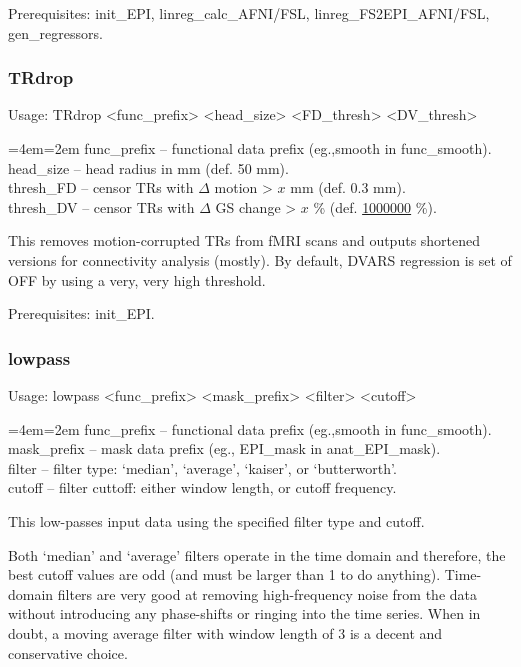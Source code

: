 \documentclass[final,titlepage,letterpaper,oneside,12pt]{article}
\renewcommand{\texttt}[2][BrickRed]{\textcolor{#1}{\ttfamily #2}}%
\newenvironment{blockquote}{%
  \par%
  \medskip
  \leftskip=4em\rightskip=2em%
  \noindent\ignorespaces}{%
  \par\medskip}
\begin{document}
Prerequisites: \texttt{init\_EPI}, \texttt{linreg\_calc\_AFNI/FSL}, \texttt{linreg\_FS2EPI\_AFNI/FSL}, \texttt{gen\_regressors}.

\subsubsection{TRdrop}
Usage: \texttt{TRdrop <func\_prefix> <head\_size> <FD\_thresh> <DV\_thresh>}

\begin{blockquote}
func\_prefix -- functional data prefix (eg.,smooth in func\_smooth). \\
head\_size -- head radius in mm (def. 50 mm). \\
thresh\_FD -- censor TRs with $\Delta$ motion > $x$ mm (def. 0.3 mm). \\
thresh\_DV -- censor TRs with $\Delta$ GS change > $x$ \% (def. \href{http://upload.wikimedia.org/wikipedia/en/1/16/Drevil_million_dollars.jpg}{1000000} \%). \
\end{blockquote}

\noindent This removes motion-corrupted TRs from fMRI scans and outputs shortened versions for connectivity analysis (mostly). By default, DVARS regression is set of OFF by using a very, very high threshold.

Prerequisites: \texttt{init\_EPI}.

\subsubsection{lowpass}
Usage: \texttt{lowpass <func\_prefix> <mask\_prefix> <filter> <cutoff>}

\begin{blockquote}
func\_prefix -- functional data prefix (eg.,smooth in func\_smooth). \\
mask\_prefix -- mask data prefix (eg., EPI\_mask in anat\_EPI\_mask). \\
filter -- filter type: `median', `average', `kaiser', or `butterworth'. \\
cutoff -- filter cuttoff: either window length, or cutoff frequency. \
\end{blockquote}

\noindent This low-passes input data using the specified filter type and cutoff. 

Both `median' and `average' filters operate in the time domain and therefore, the best cutoff values are odd (and must be larger than 1 to do anything). Time-domain filters are very good at removing high-frequency noise from the data without introducing any phase-shifts or ringing into the time series. When in doubt, a moving average filter with window length of 3 is a decent and conservative choice.
\end{document}
